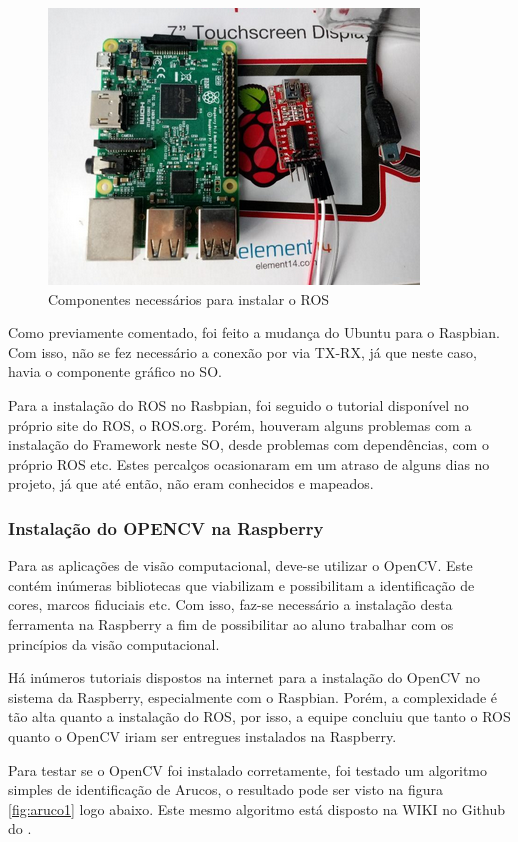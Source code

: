 \begin{figure}[H]
	\centering
	\includegraphics[scale=0.8, angle=0]{Figures/TX-RXconexao.png}
	\caption{Componentes necessários para instalar o ROS}
	\label{fig:txrx}
\end{figure}

Como previamente comentado, foi feito a mudança do Ubuntu para o Raspbian. Com isso, não se fez necessário a conexão por via TX-RX, já que neste caso, havia o componente gráfico no SO.

Para a instalação do ROS no Rasbpian, foi seguido o tutorial disponível no próprio site do ROS, o ROS.org. Porém, houveram alguns problemas com a instalação do Framework neste SO, desde problemas com dependências, com o próprio ROS etc. Estes percalços ocasionaram em um atraso de alguns dias no projeto, já que até então, não eram conhecidos e mapeados. 

\subsubsection{Instalação do OPENCV na Raspberry}
Para as aplicações de visão computacional, deve-se utilizar o OpenCV. Este contém inúmeras bibliotecas que viabilizam e possibilitam a identificação de cores, marcos fiduciais etc. Com isso, faz-se necessário a instalação desta ferramenta na Raspberry a fim de possibilitar ao aluno trabalhar com os princípios da visão computacional.

Há inúmeros tutoriais dispostos na internet para a instalação do OpenCV no sistema da Raspberry, especialmente com o Raspbian. Porém, a complexidade é tão alta quanto a instalação do ROS, por isso, a equipe concluiu que tanto o ROS quanto o OpenCV iriam ser entregues instalados na Raspberry.

Para testar se o OpenCV foi instalado corretamente, foi testado um algoritmo simples de identificação de Arucos, o resultado pode ser visto na figura \ref{fig:aruco1} logo abaixo. Este mesmo algoritmo está disposto na WIKI no Github do \cite{wikilearn}.

